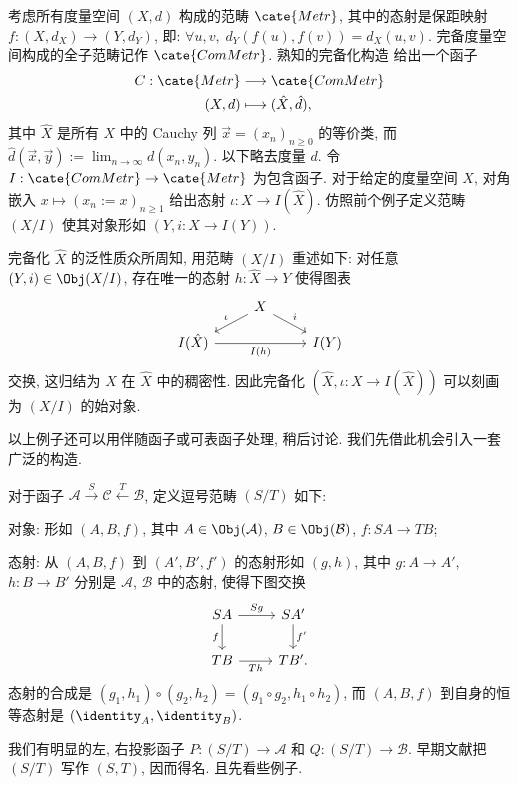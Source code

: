 \begin{example}\label{eg:metric-completion}
	考虑所有度量空间 $(X, d)$ 构成的范畴 $\cate{Metr}$, 其中的态射是保距映射 $f: (X, d_X) \to (Y, d_Y)$, 即: $\forall u,v, \; d_Y(f(u), f(v))=d_X(u,v)$. 完备度量空间构成的全子范畴记作 $\cate{ComMetr}$. 熟知的完备化构造 \cite[\S 8.1]{Xiong} 给出一个函子
	\begin{align*}
		C: \cate{Metr} & \longrightarrow \cate{ComMetr} \\
		(X, d) & \longmapsto (\hat{X}, \hat{d}),
	\end{align*}
	其中 $\hat{X}$ 是所有 $X$ 中的 Cauchy 列 $\vec{x} = (x_n)_{n \geq 0}$ 的等价类, 而 $\hat{d}(\vec{x}, \vec{y}) := \displaystyle\lim_{n \to \infty} d(x_n, y_n)$. 以下略去度量 $d$. 令 $I: \cate{ComMetr} \to \cate{Metr}$ 为包含函子. 对于给定的度量空间 $X$, 对角嵌入 $x \mapsto \left( x_n := x \right)_{n \geq 1}$ 给出态射 $\iota: X \to I(\hat{X})$. 仿照前个例子定义范畴 $(X / I)$ 使其对象形如 $(Y, i: X \to I(Y))$.

	完备化 $\hat{X}$ 的泛性质众所周知, 用范畴 $(X / I)$ 重述如下: 对任意 $(Y, i) \in \Obj(X / I)$, 存在唯一的态射 $h: \hat{X} \to Y$ 使得图表
	\[\begin{tikzcd}[row sep=small]
		{} & X \arrow[ld, "\iota"'] \arrow[rd, "i"] & \\
		I(\hat{X}) \arrow[rr, "I(h)"'] & & I(Y)
	\end{tikzcd}\]
	交换, 这归结为 $X$ 在 $\hat{X}$ 中的稠密性. 因此完备化 $(\hat{X}, \iota: X \to I(\hat{X}))$ 可以刻画为 $(X / I)$ 的始对象.
\end{example}

以上例子还可以用伴随函子或可表函子处理, 稍后讨论. 我们先借此机会引入一套广泛的构造.
\begin{definition}[逗号范畴]\label{def:comma-category}  
	对于函子 $\mathcal{A} \xrightarrow{S} \mathcal{C} \xleftarrow{T} \mathcal{B}$, 定义逗号范畴 $(S / T)$ 如下:
	\begin{compactitem}
		\item 对象: 形如 $(A, B, f)$, 其中 $A \in \Obj(\mathcal{A})$, $B \in \Obj(\mathcal{B})$, $f: SA \to TB$;
		\item 态射: 从 $(A, B, f)$ 到 $(A', B', f')$ 的态射形如 $(g,h)$, 其中 $g: A \to A'$, $h: B \to B'$ 分别是 $\mathcal{A}$, $\mathcal{B}$ 中的态射, 使得下图交换
		\[\begin{tikzcd}
			SA \arrow[r, "Sg"] \arrow[d, "f"'] & SA' \arrow[d, "f'"] \\
			TB \arrow[r, "Th"'] & TB' .
		\end{tikzcd}\]
		态射的合成是 $(g_1, h_1) \circ (g_2, h_2) = (g_1 \circ g_2, h_1 \circ h_2)$, 而 $(A,B,f)$ 到自身的恒等态射是 $(\identity_A, \identity_B)$.
	\end{compactitem}
\end{definition}
我们有明显的左, 右投影函子 $P: (S / T) \to \mathcal{A}$ 和 $Q: (S / T) \to \mathcal{B}$. 早期文献把 $(S / T)$ 写作 $(S, T)$, 因而得名. 且先看些例子.

